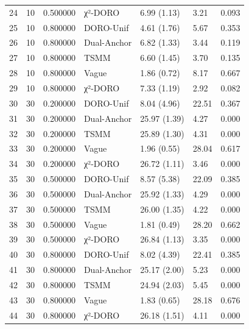 \begin{tabular}{lrrllll}
24 & 10 & 0.500000 & χ²-DORO & 6.99 (1.13) & 3.21 & 0.093 \\
25 & 10 & 0.800000 & DORO-Unif & 4.61 (1.76) & 5.67 & 0.353 \\
26 & 10 & 0.800000 & Dual-Anchor & 6.82 (1.33) & 3.44 & 0.119 \\
27 & 10 & 0.800000 & TSMM & 6.60 (1.45) & 3.70 & 0.135 \\
28 & 10 & 0.800000 & Vague & 1.86 (0.72) & 8.17 & 0.667 \\
29 & 10 & 0.800000 & χ²-DORO & 7.33 (1.19) & 2.92 & 0.082 \\
30 & 30 & 0.200000 & DORO-Unif & 8.04 (4.96) & 22.51 & 0.367 \\
31 & 30 & 0.200000 & Dual-Anchor & 25.97 (1.39) & 4.27 & 0.000 \\
32 & 30 & 0.200000 & TSMM & 25.89 (1.30) & 4.31 & 0.000 \\
33 & 30 & 0.200000 & Vague & 1.96 (0.55) & 28.04 & 0.617 \\
34 & 30 & 0.200000 & χ²-DORO & 26.72 (1.11) & 3.46 & 0.000 \\
35 & 30 & 0.500000 & DORO-Unif & 8.57 (5.38) & 22.09 & 0.385 \\
36 & 30 & 0.500000 & Dual-Anchor & 25.92 (1.33) & 4.29 & 0.000 \\
37 & 30 & 0.500000 & TSMM & 26.00 (1.35) & 4.22 & 0.000 \\
38 & 30 & 0.500000 & Vague & 1.81 (0.49) & 28.20 & 0.662 \\
39 & 30 & 0.500000 & χ²-DORO & 26.84 (1.13) & 3.35 & 0.000 \\
40 & 30 & 0.800000 & DORO-Unif & 8.02 (4.39) & 22.41 & 0.385 \\
41 & 30 & 0.800000 & Dual-Anchor & 25.17 (2.00) & 5.23 & 0.000 \\
42 & 30 & 0.800000 & TSMM & 24.94 (2.03) & 5.45 & 0.000 \\
43 & 30 & 0.800000 & Vague & 1.83 (0.65) & 28.18 & 0.676 \\
44 & 30 & 0.800000 & χ²-DORO & 26.18 (1.51) & 4.11 & 0.000 \\
\bottomrule
\end{tabular}

